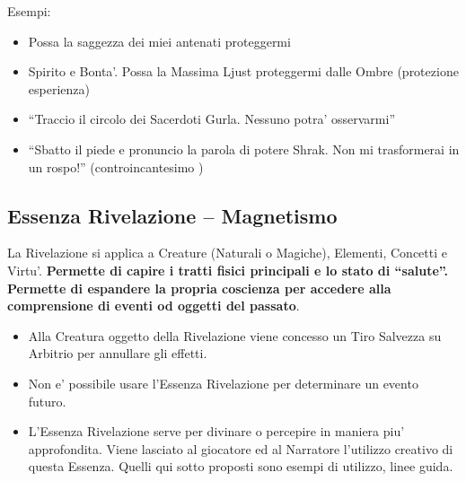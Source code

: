 \documentclass[a4paper,11pt,twoside,openany]{dndbook}
\begin{document}
\bigskip


Esempi:
\begin{itemize}
\item 
Possa la saggezza dei miei antenati proteggermi 
\item 
Spirito e Bonta'. Possa la Massima Ljust proteggermi dalle Ombre (protezione esperienza) 
\item 
``Traccio il circolo dei Sacerdoti Gurla. Nessuno potra' osservarmi'' 
\item 
``Sbatto il piede e pronuncio la parola di potere Shrak. Non mi trasformerai in un rospo!'' (controincantesimo )
\end{itemize}

\pagebreak

\subsection{Essenza Rivelazione -- Magnetismo}

\label{essenza-rivelazione---magnetismo}

La Rivelazione si applica a Creature (Naturali o Magiche), Elementi, Concetti e Virtu'. \textbf{Permette di capire i tratti fisici principali e lo stato di ``salute''. Permette di espandere la propria coscienza per accedere alla comprensione di eventi od oggetti del passato}.
\begin{itemize}
\item 
Alla Creatura oggetto della Rivelazione viene concesso un Tiro Salvezza
su Arbitrio per annullare gli effetti. 
\item 
Non e' possibile usare l'Essenza Rivelazione per determinare un evento futuro. 
\item 
L'Essenza Rivelazione serve per divinare o percepire in maniera piu' approfondita. Viene lasciato al giocatore ed al Narratore l'utilizzo creativo di questa Essenza. Quelli qui sotto proposti sono esempi di utilizzo, linee guida. 
\end{itemize}

\bigskip
\end{document}
